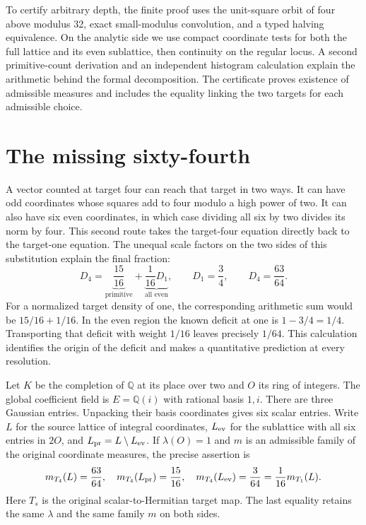\documentclass[12pt,letterpaper]{article}
\begin{document}
To certify arbitrary depth, the finite proof uses the unit-square orbit of four above modulus 32, exact small-modulus convolution, and a typed halving equivalence. On the analytic side we use compact coordinate tests for both the full lattice and its even sublattice, then continuity on the regular locus. A second primitive-count derivation and an independent histogram calculation explain the arithmetic behind the formal decomposition. The certificate proves existence of admissible measures and includes the equality linking the two targets for each admissible choice.
\clearpage{\small\setlength{\parskip}{0pt}\tableofcontents}\clearpage{}
\section{The missing sixty-fourth}
A vector counted at target four can reach that target in two ways. It can have odd coordinates whose squares add to four modulo a high power of two. It can also have six even coordinates, in which case dividing all six by two divides its norm by four. This second route takes the target-four equation directly back to the target-one equation. The unequal scale factors on the two sides of this substitution explain the final fraction:
\[
 D_4=\underbrace{\frac{15}{16}}_{\text{primitive}}
        +\underbrace{\frac{1}{16}D_1}_{\text{all even}},
 \qquad D_1=\frac34,\qquad D_4=\frac{63}{64}.
\]
For a normalized target density of one, the corresponding arithmetic sum would be $15/16+1/16$. In the even region the known deficit at one is $1-3/4=1/4$. Transporting that deficit with weight $1/16$ leaves precisely $1/64$. This calculation identifies the origin of the deficit and makes a quantitative prediction at every resolution.

Let $K$ be the completion of $\mathbb Q$ at its place over two and $O$ its ring of integers. The global coefficient field is $E=\mathbb Q(i)$ with rational basis $1,i$. There are three Gaussian entries. Unpacking their basis coordinates gives six scalar entries. Write $L$ for the source lattice of integral coordinates, $L_{\rm ev}$ for the sublattice with all six entries in $2O$, and $L_{\rm pr}=L\setminus L_{\rm ev}$. If $\lambda(O)=1$ and $m$ is an admissible family of the original coordinate measures, the precise assertion is
\[
 m_{T_4}(L)=\frac{63}{64},\quad
 m_{T_4}(L_{\rm pr})=\frac{15}{16},\quad
 m_{T_4}(L_{\rm ev})=\frac{3}{64}
       =\frac1{16}m_{T_1}(L).
\]
Here $T_s$ is the original scalar-to-Hermitian target map. The last equality retains the same $\lambda$ and the same family $m$ on both sides.
\end{document}
